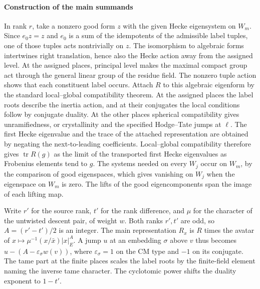 \paragraph{Construction of the main summands}
In rank \(r\), take a nonzero good form \(z\) with the given Hecke eigensystem on \(W_m\).
Since \(e_0z=z\) and \(e_0\) is a sum of the idempotents of the admissible label tuples,
one of those tuples acts nontrivially on \(z\). The isomorphism to algebraic forms intertwines
right translation, hence also the Hecke action away from the assigned level.
At the assigned places, principal level makes the maximal compact group act through the general
linear group of the residue field. The nonzero tuple action shows that each constituent label
occurs. Attach \(R\) to this algebraic eigenform by the standard local--global compatibility
theorem. At the assigned places the label roots describe the inertia action, and at their
conjugates the local conditions follow by conjugate duality. At the other places spherical
compatibility gives unramifiedness, or crystallinity and the specified Hodge--Tate jumps at \(\ell\).
The first Hecke eigenvalue and the trace of the attached representation are obtained by negating
the next-to-leading coefficients. Local--global compatibility therefore gives
\(\operatorname{tr}R(g)\) as the limit of the transported first Hecke eigenvalues as Frobenius
elements tend to \(g\). The systems needed on every \(W_j\) occur on \(W_m\), by the comparison
of good eigenspaces, which gives vanishing on \(W_j\) when the eigenspace on \(W_m\) is zero.
The lifts of the good eigencomponents span the image of each lifting map.

Write \(r'\) for the source rank, \(t'\) for the rank difference, and \(\mu\) for the
character of the untwisted descent pair, of weight \(w\). Both ranks \(r',t'\) are odd, so
\(A=(r'-t')/2\) is an integer. The main representation \(R_x\) is \(R\) times the avatar of
\(x\mapsto\mu^{-1}(x/\bar x)|x|_E^A\).
A jump \(u\) at an embedding \(\sigma\) above \(v\) thus becomes
\(u-(A-\varepsilon_\sigma w(v))\), where \(\varepsilon_\sigma=1\) on the CM type
and \(-1\) on its conjugate. The tame part at the finite places scales the label roots by
the finite-field element naming the inverse tame character.
The cyclotomic power shifts the duality exponent to \(1-t'\).


